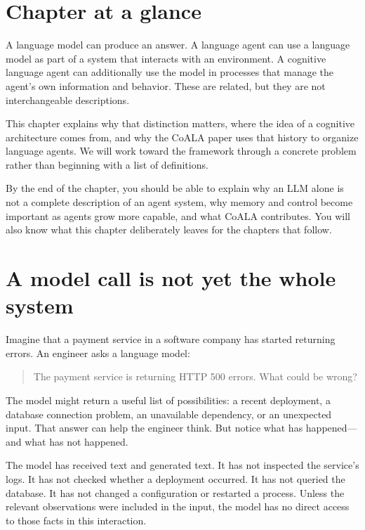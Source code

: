 \section*{Chapter at a glance}
{}\label{chapter-at-a-glance}

A language model can produce an answer. A language agent can use a language model as part of a system that interacts with an environment. A cognitive language agent can additionally use the model in processes that manage the agent's own information and behavior. These are related, but they are not interchangeable descriptions.

This chapter explains why that distinction matters, where the idea of a cognitive architecture comes from, and why the CoALA paper uses that history to organize language agents. We will work toward the framework through a concrete problem rather than beginning with a list of definitions.

\begin{learningbox}
By the end of the chapter, you should be able to explain why an LLM alone is not a complete description of an agent system, why memory and control become important as agents grow more capable, and what CoALA contributes. You will also know what this chapter deliberately leaves for the chapters that follow.
\end{learningbox}

\section{A model call is not yet the whole system}\label{a-model-call-is-not-yet-the-whole-system}

Imagine that a payment service in a software company has started returning errors. An engineer asks a language model:

\begin{quote}
The payment service is returning HTTP 500 errors. What could be wrong?
\end{quote}

The model might return a useful list of possibilities: a recent deployment, a database connection problem, an unavailable dependency, or an unexpected input. That answer can help the engineer think. But notice what has happened---and what has not happened.

The model has received text and generated text. It has not inspected the service's logs. It has not checked whether a deployment occurred. It has not queried the database. It has not changed a configuration or restarted a process. Unless the relevant observations were included in the input, the model has no direct access to those facts in this interaction.

